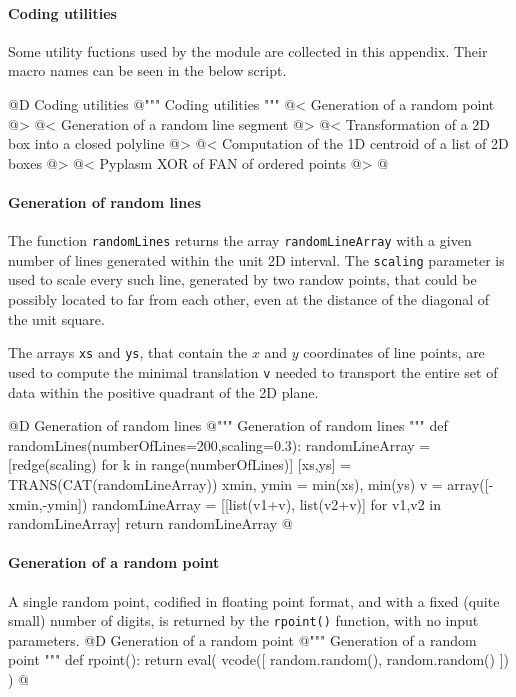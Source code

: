\documentclass[11pt,oneside]{article}    %
\begin{document}
\paragraph{Coding utilities}

Some utility fuctions used by the module are collected in this appendix. Their macro names can be seen in the below script.

@D Coding utilities
@{""" Coding utilities """
@< Generation of a random point @>
@< Generation of a random line segment @>
@< Transformation of a 2D box into a closed polyline @>
@< Computation of the 1D centroid of a list of 2D boxes @>
@< Pyplasm XOR of FAN of ordered points @>
@}


\paragraph{Generation of random lines}
The function \texttt{randomLines} returns the array \texttt{randomLineArray} with a given number of lines generated within the unit 2D interval. The \texttt{scaling} parameter is used to scale every such line, generated by two randow points, that could be possibly located to far from each other, even at the distance of the diagonal of the unit square.

The arrays \texttt{xs} and \texttt{ys}, that contain the $x$ and $y$ coordinates of line points, are used to compute the minimal translation \texttt{v} needed to transport the entire set of data within the positive quadrant of the 2D plane. 

@D Generation of random lines
@{""" Generation of random lines """
def randomLines(numberOfLines=200,scaling=0.3):
    randomLineArray = [redge(scaling) for k in range(numberOfLines)]
    [xs,ys] = TRANS(CAT(randomLineArray))
    xmin, ymin = min(xs), min(ys)
    v = array([-xmin,-ymin])
    randomLineArray = [[list(v1+v), list(v2+v)] for v1,v2 in randomLineArray]
    return randomLineArray
@}


\paragraph{Generation of a random point}
A single random point, codified in floating point format, and with a fixed (quite small) number of digits, is returned by the \texttt{rpoint()} function, with no input parameters.
@D Generation of a random point
@{""" Generation of a random point """
def rpoint():
    return eval( vcode([ random.random(), random.random() ]) )
@}
    
\end{document}
